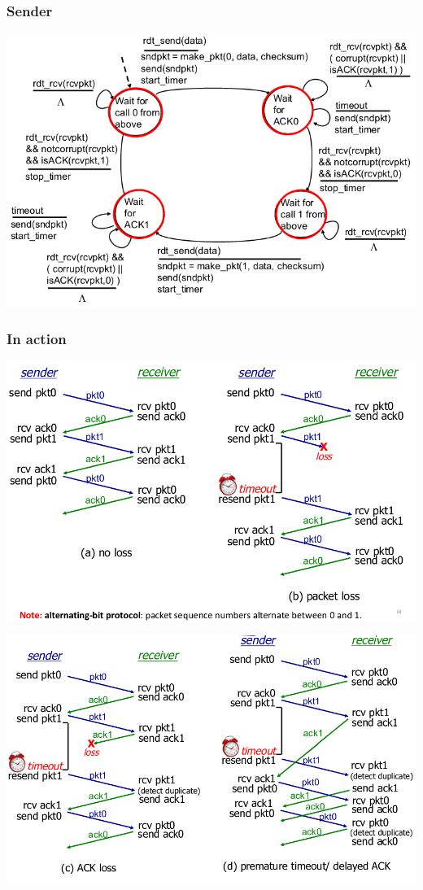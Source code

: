 \documentclass{article}[18pt]
\begin{document}
\subsubsection{Sender}
\begin{center}
	\includegraphics[scale=0.7]{rdt_sender}
\end{center}
\subsubsection{In action}
\begin{center}
	\includegraphics[scale=0.7]{rdt_in_action}
\end{center}
\begin{center}
	\includegraphics[scale=0.7]{rdt_in_action1}
\end{center}
\end{document}
